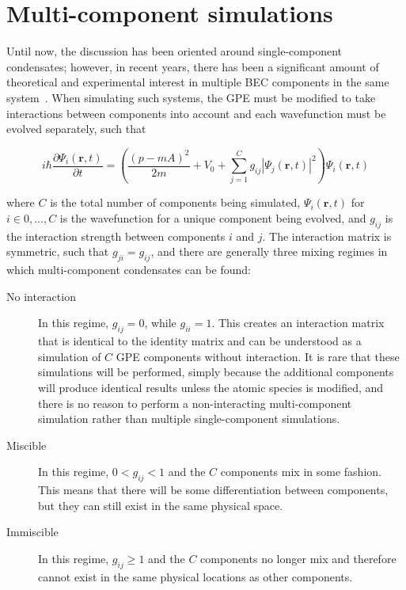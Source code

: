 \section{Multi-component simulations}

Until now, the discussion has been oriented around single-component condensates; however, in recent years, there has been a significant amount of theoretical and experimental interest in multiple BEC components in the same system~.
When simulating such systems, the GPE must be modified to take interactions between components into account and each wavefunction must be evolved separately, such that 

\begin{equation}
i \hbar \frac{\partial \Psi_i(\mathbf{r},t)}{\partial t} = \left(\frac{(p-mA)^2}{2m} + V_0 + \sum_{j=1}^C g_{ij}|\Psi_j(\mathbf{r},t)|^2 \right)\Psi_i(\mathbf{r},t)
\label{eqn:GPE}
\end{equation}

\noindent where $C$ is the total number of components being simulated, $\Psi_i(\mathbf{r},t)$ for $i \in {0,...,C}$ is the wavefunction for a unique component being evolved, and $g_{ij}$ is the interaction strength between components $i$ and $j$.
The interaction matrix is symmetric, such that $g_{ji} = g_{ij}$, and there are generally three mixing regimes in which multi-component condensates can be found:

\begin{description}
\item[No interaction] In this regime, $g_{ij}=0$, while $g_{ii} = 1$. This creates an interaction matrix that is identical to the identity matrix and can be understood as a simulation of $C$ GPE components without interaction. It is rare that these simulations will be performed, simply because the additional components will produce identical results unless the atomic species is modified, and there is no reason to perform a non-interacting multi-component simulation rather than multiple single-component simulations.
\item[Miscible] In this regime, $0 < g_{ij} < 1$ and the $C$ components mix in some fashion. This means that there will be some differentiation between components, but they can still exist in the same physical space.
\item[Immiscible] In this regime, $g_{ij} \geq 1$ and the $C$ components no longer mix and therefore cannot exist in the same physical locations as other components.
\end{description}

